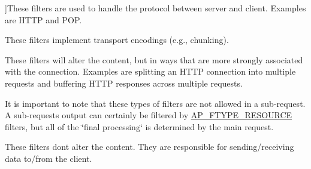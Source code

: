 \begin{Desc}
\begin{description}
{}]These filters are used to handle the protocol between server and client. Examples are H\+T\+TP and P\+OP. \item[{\em 
A\+P\+\_\+\+F\+T\+Y\+P\+E\+\_\+\+T\+R\+A\+N\+S\+C\+O\+DE\hypertarget{group__APACHE__CORE__FILTER_gga6dc4721ae075c103a3f3a93775d139faa41e2154d17fc1aa44f7b3b088db8c390}{}\label{group__APACHE__CORE__FILTER_gga6dc4721ae075c103a3f3a93775d139faa41e2154d17fc1aa44f7b3b088db8c390}
}]These filters implement transport encodings (e.\+g., chunking). \item[{\em 
A\+P\+\_\+\+F\+T\+Y\+P\+E\+\_\+\+C\+O\+N\+N\+E\+C\+T\+I\+ON\hypertarget{group__APACHE__CORE__FILTER_gga6dc4721ae075c103a3f3a93775d139faa7ae402ebd5ae1d7453806499e9e06d6a}{}\label{group__APACHE__CORE__FILTER_gga6dc4721ae075c103a3f3a93775d139faa7ae402ebd5ae1d7453806499e9e06d6a}
}]These filters will alter the content, but in ways that are more strongly associated with the connection. Examples are splitting an H\+T\+TP connection into multiple requests and buffering H\+T\+TP responses across multiple requests.

It is important to note that these types of filters are not allowed in a sub-\/request. A sub-\/request\textquotesingle{}s output can certainly be filtered by \hyperlink{group__APACHE__CORE__FILTER_gga6dc4721ae075c103a3f3a93775d139faaac592192246ceec25733c9a957cac878}{A\+P\+\_\+\+F\+T\+Y\+P\+E\+\_\+\+R\+E\+S\+O\+U\+R\+CE} filters, but all of the \char`\"{}final
    processing\char`\"{} is determined by the main request. \item[{\em 
A\+P\+\_\+\+F\+T\+Y\+P\+E\+\_\+\+N\+E\+T\+W\+O\+RK\hypertarget{group__APACHE__CORE__FILTER_gga6dc4721ae075c103a3f3a93775d139faa75f03b263da1cc0421ffbde1fb74a909}{}\label{group__APACHE__CORE__FILTER_gga6dc4721ae075c103a3f3a93775d139faa75f03b263da1cc0421ffbde1fb74a909}
}]These filters don\textquotesingle{}t alter the content. They are responsible for sending/receiving data to/from the client. \end{description}
\end{Desc}

